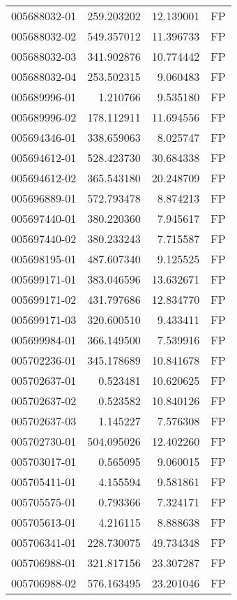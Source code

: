 \begin{tabular}{lrrl}
005688032-01 &  259.203202 &    12.139001 &   FP \\
005688032-02 &  549.357012 &    11.396733 &   FP \\
005688032-03 &  341.902876 &    10.774442 &   FP \\
005688032-04 &  253.502315 &     9.060483 &   FP \\
005689996-01 &    1.210766 &     9.535180 &   FP \\
005689996-02 &  178.112911 &    11.694556 &   FP \\
005694346-01 &  338.659063 &     8.025747 &   FP \\
005694612-01 &  528.423730 &    30.684338 &   FP \\
005694612-02 &  365.543180 &    20.248709 &   FP \\
005696889-01 &  572.793478 &     8.874213 &   FP \\
005697440-01 &  380.220360 &     7.945617 &   FP \\
005697440-02 &  380.233243 &     7.715587 &   FP \\
005698195-01 &  487.607340 &     9.125525 &   FP \\
005699171-01 &  383.046596 &    13.632671 &   FP \\
005699171-02 &  431.797686 &    12.834770 &   FP \\
005699171-03 &  320.600510 &     9.433411 &   FP \\
005699984-01 &  366.149500 &     7.539916 &   FP \\
005702236-01 &  345.178689 &    10.841678 &   FP \\
005702637-01 &    0.523481 &    10.620625 &   FP \\
005702637-02 &    0.523582 &    10.840126 &   FP \\
005702637-03 &    1.145227 &     7.576308 &   FP \\
005702730-01 &  504.095026 &    12.402260 &   FP \\
005703017-01 &    0.565095 &     9.060015 &   FP \\
005705411-01 &    4.155594 &     9.581861 &   FP \\
005705575-01 &    0.793366 &     7.324171 &   FP \\
005705613-01 &    4.216115 &     8.888638 &   FP \\
005706341-01 &  228.730075 &    49.734348 &   FP \\
005706988-01 &  321.817156 &    23.307287 &   FP \\
005706988-02 &  576.163495 &    23.201046 &   FP \\

\end{tabular}
